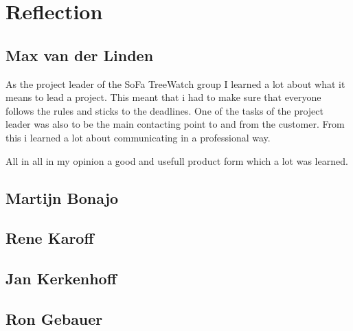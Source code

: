 \section{Reflection}
\subsection{Max van der Linden}
As the project leader of the SoFa TreeWatch group I learned a lot about what it means to lead a project. This meant that i had to make sure that everyone follows the rules and sticks to the deadlines. One of the tasks of the project leader was also to be the main contacting point to and from the customer. From this i learned a lot about communicating in a professional way.

All in all in my opinion a good and usefull product form which a lot was learned.

\subsection{Martijn Bonajo}
\subsection{Rene Karoff}
\subsection{Jan Kerkenhoff}
\subsection{Ron Gebauer}